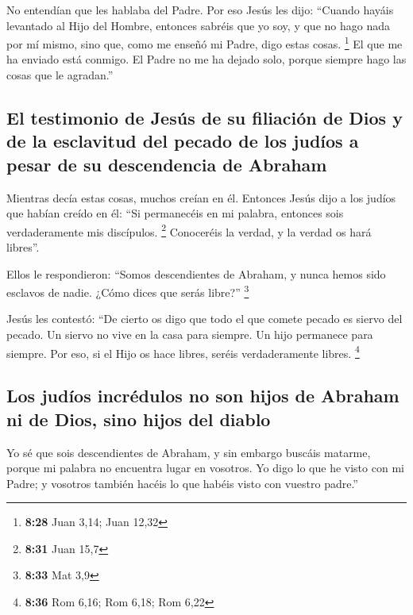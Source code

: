  No entendían que les hablaba del Padre. 
Por eso Jesús les dijo: ``Cuando hayáis levantado al Hijo del Hombre,
entonces sabréis que yo soy, y que no hago nada por mí mismo, sino que,
como me enseñó mi Padre, digo estas cosas. \footnote{\textbf{8:28} Juan
  3,14; Juan 12,32}  El que me ha enviado está conmigo.
El Padre no me ha dejado solo, porque siempre hago las cosas que le
agradan.''

\hypertarget{el-testimonio-de-jesuxfas-de-su-filiaciuxf3n-de-dios-y-de-la-esclavitud-del-pecado-de-los-juduxedos-a-pesar-de-su-descendencia-de-abraham}{%
\subsection{El testimonio de Jesús de su filiación de Dios y de la
esclavitud del pecado de los judíos a pesar de su descendencia de
Abraham}\label{el-testimonio-de-jesuxfas-de-su-filiaciuxf3n-de-dios-y-de-la-esclavitud-del-pecado-de-los-juduxedos-a-pesar-de-su-descendencia-de-abraham}}

 Mientras decía estas cosas, muchos creían en él.
 Entonces Jesús dijo a los judíos que habían creído en
él: ``Si permanecéis en mi palabra, entonces sois verdaderamente mis
discípulos. \footnote{\textbf{8:31} Juan 15,7} 
Conoceréis la verdad, y la verdad os hará libres''.

 Ellos le respondieron: ``Somos descendientes de Abraham,
y nunca hemos sido esclavos de nadie. ¿Cómo dices que serás libre?''
\footnote{\textbf{8:33} Mat 3,9}

 Jesús les contestó: ``De cierto os digo que todo el que
comete pecado es siervo del pecado.  Un siervo no vive en
la casa para siempre. Un hijo permanece para siempre. 
Por eso, si el Hijo os hace libres, seréis verdaderamente libres.
\footnote{\textbf{8:36} Rom 6,16; Rom 6,18; Rom 6,22}

\hypertarget{los-juduxedos-incruxe9dulos-no-son-hijos-de-abraham-ni-de-dios-sino-hijos-del-diablo}{%
\subsection{Los judíos incrédulos no son hijos de Abraham ni de Dios,
sino hijos del
diablo}\label{los-juduxedos-incruxe9dulos-no-son-hijos-de-abraham-ni-de-dios-sino-hijos-del-diablo}}

 Yo sé que sois descendientes de Abraham, y sin embargo
buscáis matarme, porque mi palabra no encuentra lugar en vosotros.
 Yo digo lo que he visto con mi Padre; y vosotros también
hacéis lo que habéis visto con vuestro padre.''

